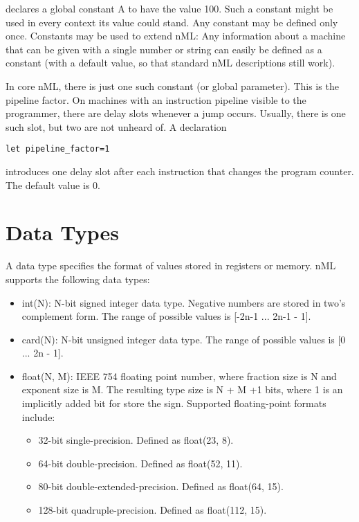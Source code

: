\documentclass[oneside,final,14pt]{extreport}
\begin{document}
declares a global constant A to have the value 100. Such a constant might be used in every context
its value could stand. Any constant may be defined only once. Constants may be used to extend nML:
Any information about a machine that can be given with a single number or string can easily be
defined as a constant (with a default value, so that standard nML descriptions still work).

In core nML, there is just one such constant (or global parameter).
This is the pipeline factor. On machines with an instruction pipeline visible to the programmer,
there are delay slots whenever a jump occurs. Usually, there is one such slot, but two are not
unheard of. A declaration

\begin{lstlisting}
let pipeline_factor=1
\end{lstlisting}

introduces one delay slot after each instruction that changes the program counter. The default
value is 0.

\section{Data Types}

A data type specifies the format of values stored in registers or memory. nML supports
the following data types: 

\begin{itemize}

\item int(N): N-bit signed integer data type. Negative numbers are stored in two's 
complement form. The range of possible values is [-2n-1 ... 2n-1 - 1].

\item card(N): N-bit unsigned integer data type. The range of possible values is [0 ... 2n - 1].

\item float(N, M): IEEE 754 floating point number, where fraction size is N and exponent size is M.
The resulting type size is N + M +1 bits, where 1 is an implicitly added bit for store the sign.
Supported floating-point formats include:

\begin{itemize}
\item 32-bit single-precision. Defined as float(23, 8).
\item 64-bit double-precision. Defined as float(52, 11).
\item 80-bit double-extended-precision. Defined as float(64, 15).
\item 128-bit quadruple-precision. Defined as float(112, 15).
\end{itemize}

\end{itemize}
\end{document}
